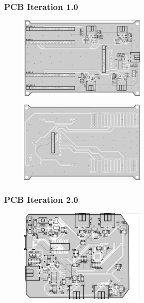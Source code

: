 \subsubsection{PCB Iteration 1.0}

\begin{figure}[H]
    \centering
    \captionsetup{justification=centering, margin=1cm}
    \includegraphics[width=0.55\textwidth]{img/PCBit1_front.png}
\end{figure}

\begin{figure}[H]
    \centering
    \captionsetup{justification=centering, margin=1cm}
    \includegraphics[width=0.55\textwidth]{img/PCBit1_back.png}
\end{figure}

\subsubsection{PCB Iteration 2.0}

\begin{figure}[H]
    \centering
    \captionsetup{justification=centering, margin=1cm}
    \includegraphics[width=0.55\textwidth]{img/PCBit2_front.png}
\end{figure}

